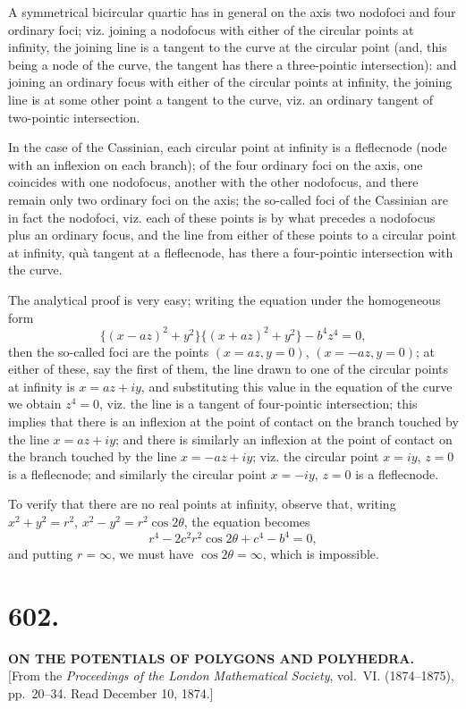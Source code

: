 \documentclass[11pt,a4paper]{book}
\begin{document}
A symmetrical bicircular quartic has in general on the axis two nodofoci
and four ordinary foci; viz. joining a nodofocus with either of the circular
points at infinity, the joining line is a tangent to the curve at the
circular point (and, this being a node of the curve, the tangent has there a
three-pointic intersection): and joining an ordinary focus with either of the
circular points at infinity, the joining line is at some other point a
tangent to the curve, viz. an ordinary tangent of two-pointic intersection.

In the case of the Cassinian, each circular point at infinity is a
fleflecnode (node with an inflexion on each branch); of the four ordinary
foci on the axis, one coincides with one nodofocus, another with the other
nodofocus, and there remain only two ordinary foci on the axis; the
so-called foci of the Cassinian are in fact the nodofoci, viz. each of these
points is by what precedes a nodofocus plus an ordinary focus, and the line
from either of these points to a circular point at infinity, qu\`{a} tangent at
a fleflecnode, has there a four-pointic intersection with the curve.

The analytical proof is very easy; writing the equation under the
homogeneous form
\[
\{(x-az)^2+y^2\} \{(x+az)^2+y^2\} - b^4z^4 = 0,
\]
then the so-called foci are the points $(x=az, y=0)$, $(x=-az, y=0)$; at
either of these, say the first of them, the line drawn to one of the
circular points at infinity is $x=az+iy$, and substituting this value in the
equation of the curve we obtain $z^4=0$, viz. the line is a tangent of
four-pointic intersection; this implies that there is an inflexion at the
point of contact on the branch touched by the line $x=az+iy$; and there is
similarly an inflexion at the point of contact on the branch touched by the
line $x=-az+iy$; viz. the circular point $x=iy$, $z=0$ is a fleflecnode;
and similarly the circular point $x=-iy$, $z=0$ is a fleflecnode.

To verify that there are no real points at infinity, observe that, writing
$x^2+y^2=r^2$, $x^2-y^2=r^2\cos 2\theta$, the equation becomes
\[
r^4 - 2c^2r^2\cos 2\theta + c^4 - b^4 = 0,
\]
and putting $r=\infty$, we must have $\cos 2\theta=\infty$, which is impossible.

\newpage
\section*{602.}
\begin{center}
{\large\bfseries ON THE POTENTIALS OF POLYGONS AND POLYHEDRA.}\\[0.5em]
[From the \textit{Proceedings of the London Mathematical Society}, vol.~VI. (1874--1875),
pp.~20--34. Read December 10, 1874.]
\end{center}
\end{document}
